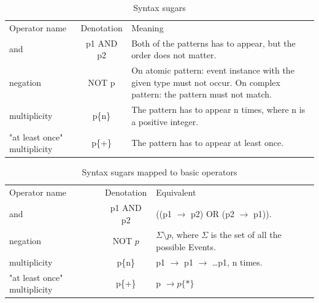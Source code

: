 		\begin{table}
		\caption{Syntax sugars}		
		\label{tab:cep:veplsugar}
		\begin{tabular}{lcm{6cm}}
		\centering
		Operator name &	Denotation & Meaning \\
		and &	p1 AND p2 &	Both of the patterns has to appear, but the order does not matter.\\
		negation &	NOT p &	On atomic pattern: event instance with the given type must not occur. On complex pattern: the pattern must not match. \\
		multiplicity &	p\{n\} &	The pattern has to appear n times, where n is a positive integer.\\
		"at least once" multiplicity &	p\{+\} &	The pattern has to appear at least once. \\
		\end{tabular}
		\end{table}
		
		\begin{table}
		\caption{Syntax sugars mapped to basic operators}		
		\label{tab:cep:veplsugartobasic}
		\begin{tabular}{lcm{6cm}}
		\centering
		Operator name &	Denotation & Equivalent \\
		and &	p1 AND p2 & ((p1 $\rightarrow$ p2) OR (p2 $\rightarrow$ p1)). \\
		negation &	NOT $p$ & $\Sigma \setminus p$, where $\Sigma$ is the set of all the possible Events. \\
		multiplicity &	p\{n\} &	p1 $\rightarrow$ p1 $\rightarrow$ \dots p1, n times. \\
		"at least once" multiplicity &	p\{+\} & p $\rightarrow p\{\ast\}$ \\
		\end{tabular}
		\end{table}

		
